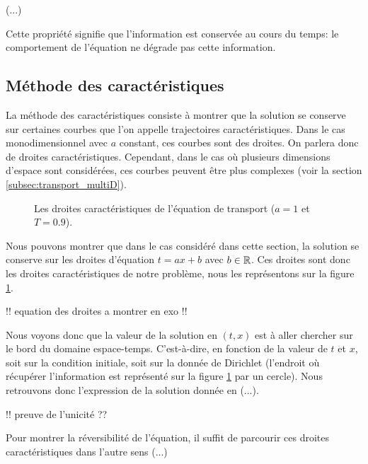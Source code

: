 \documentclass[12pt,a4paper,twoside]{article}
\begin{document}
\begin{proposition}
  (...)
\end{proposition}

Cette propri\'et\'e signifie que l'information est conserv\'ee au cours du temps:
le comportement de l'\'equation ne d\'egrade pas cette information.


\subsection{M\'ethode des caract\'eristiques}

La m\'ethode des caract\'eristiques consiste \`a montrer que la solution
se conserve sur certaines courbes que l'on appelle trajectoires caract\'eristiques.
Dans le cas monodimensionnel avec $a$ constant, ces courbes sont des droites.
On parlera donc de droites caract\'eristiques.
Cependant, dans le cas o\`u plusieurs dimensions d'espace sont consid\'er\'ees,
ces courbes peuvent \^etre plus complexes (voir la section \ref{subsec:transport_multiD}).

\begin{figure}
\centering
\begin{tikzpicture}[scale = 9]
  
\end{tikzpicture}
\caption{Les droites caract\'eristiques de l'\'equation de transport
  ($a=1$ et $T=0.9$).}
\label{fig:D_carac}
\end{figure}

Nous pouvons montrer que dans le cas consid\'er\'e dans cette section,
la solution se conserve sur les droites d'\'equation $t=ax+b$ avec $b \in \R$.
Ces droites sont donc les droites caract\'eristiques de notre probl\`eme,
nous les repr\'esentons sur la figure \ref{fig:D_carac}.

!! equation des droites a montrer en exo !!

Nous voyons donc que la valeur de la solution en $(t,x)$ est \`a aller chercher
sur le bord du domaine espace-temps. C'est-\`a-dire, en fonction de la valeur de 
$t$ et $x$, soit sur la condition initiale, soit sur la donn\'ee de Dirichlet
(l'endroit o\`u r\'ecup\'erer l'information est repr\'esent\'e sur la figure
\ref{fig:D_carac} par un cercle).
Nous retrouvons donc l'expression de la solution donn\'ee en (...).


!! preuve de l'unicit\'e ??

Pour montrer la r\'eversibilit\'e de l'\'equation, il suffit de parcourir ces droites 
caract\'eristiques dans l'autre sens (...)
\end{document}
